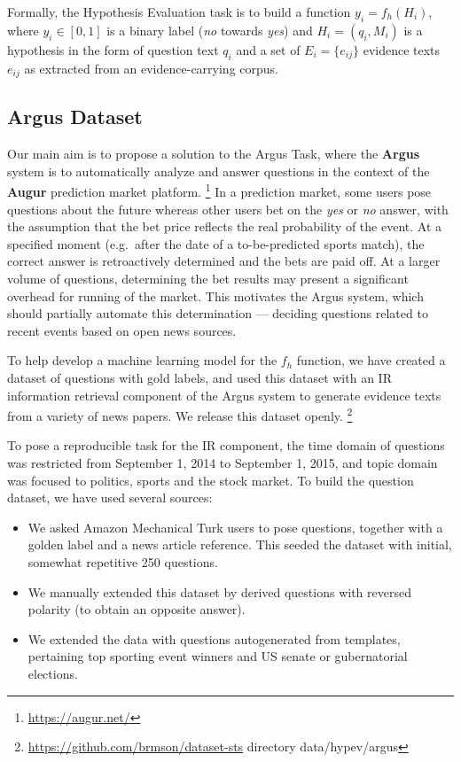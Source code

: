 \documentclass[11pt]{article}
\begin{document}
Formally, the Hypothesis Evaluation task is to build a function $y_i = f_h(H_i)$,
where $y_i \in [0,1]$ is a binary label (\textit{no} towards \textit{yes})
and $H_i = (q_i, M_i)$ is a hypothesis in the form of question text $q_i$
and a set of $E_i = \{e_{ij}\}$ evidence texts $e_{ij}$ as extracted
from an evidence-carrying corpus.


\subsection{Argus Dataset}

Our main aim is to propose a solution to the Argus Task, where
the \textbf{Argus} system \cite{arguswp} \cite{argus}
is to automatically analyze and answer questions
in the context of the \textbf{Augur} prediction market platform.%
\footnote{\url{https://augur.net/}}
In a prediction market, some users pose questions about the future
whereas other users bet on the \textit{yes} or \textit{no} answer,
with the assumption that the bet price reflects the real probability
of the event.  At a specified moment (e.g.\ after the date of a to-be-predicted sports match), the
correct answer is retroactively determined and the bets are paid off.
At a larger volume of questions, determining the bet results may
present a significant overhead for running of the market.
This motivates the Argus system, which should partially automate
this determination --- deciding questions related to recent events
based on open news sources.

To help develop a machine learning model for the $f_h$ function,
we have created a dataset of questions with gold labels, and used
this dataset with an IR information retrieval component of the Argus
system to generate evidence texts from a variety of news papers.
We release this dataset openly.%
\footnote{\url{https://github.com/brmson/dataset-sts} directory data/hypev/argus}

To pose a reproducible task for the IR component, the time domain
of questions was restricted from September 1, 2014 to September 1, 2015,
and topic domain was focused to politics, sports and the stock market.
To build the question dataset, we have used several sources:
\begin{itemize}
	\item We asked Amazon Mechanical Turk users to pose questions, together with a golden label and a news article reference.
		This seeded the dataset with initial, somewhat repetitive 250 questions.
	\item We manually extended this dataset by derived questions with reversed polarity (to obtain an opposite answer).
	\item We extended the data with questions autogenerated from templates, pertaining top sporting event winners and US senate or gubernatorial elections.
\end{itemize}
\end{document}

